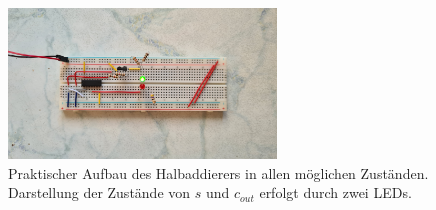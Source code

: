 \begin{figure}[h!]
\begin{minipage}{.5\textwidth}
	\end{minipage}%
	\begin{minipage}{.5\textwidth}
		\centering
		\includegraphics[height=4cm, keepaspectratio]{./Fotos/HA-11.jpg}
	\end{minipage}
	\caption{Praktischer Aufbau des Halbaddierers in allen möglichen Zuständen. Darstellung der Zustände von $s$ und $c_{out}$ erfolgt durch zwei LEDs.}
\end{figure}

